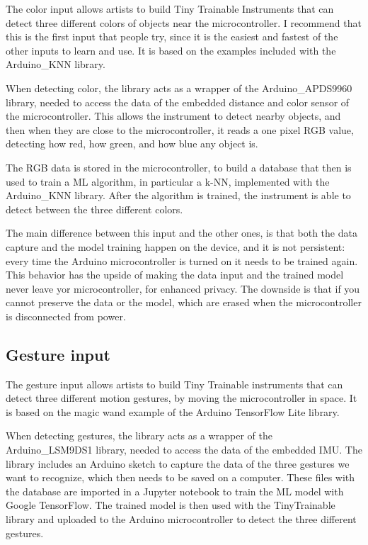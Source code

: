 The color input allows artists to build Tiny Trainable Instruments that can detect three different colors of objects near the microcontroller. I recommend that this is the first input that people try, since it is the easiest and fastest of the other inputs to learn and use. It is based on the examples included with the Arduino{\_}KNN library.

When detecting color, the library acts as a wrapper of the Arduino{\_}APDS9960 library, needed to access the data of the embedded distance and color sensor of the microcontroller. This allows the instrument to detect nearby objects, and then when they are close to the microcontroller, it reads a one pixel \acrshort{RGB} value, detecting how red, how green, and how blue any object is.

The \acrshort{RGB} data is stored in the microcontroller, to build a database that then is used to train a \acrshort{ML} algorithm, in particular a \acrfull{k-NN}, implemented with the Arduino{\_}KNN library. After the algorithm is trained, the instrument is able to detect between the three different colors.

The main difference between this input and the other ones, is that both the data capture and the model training happen on the device, and it is not persistent: every time the Arduino microcontroller is turned on it needs to be trained again. This behavior has the upside of making the data input and the trained model never leave yor microcontroller, for enhanced privacy. The downside is that if you cannot preserve the data or the model, which are erased when the microcontroller is disconnected from power.

\subsection{Gesture input}

The gesture input allows artists to build Tiny Trainable instruments that can detect three different motion gestures, by moving the microcontroller in space. It is based on the magic wand example of the Arduino TensorFlow Lite library.

When detecting gestures, the library acts as a wrapper of the Arduino{\_}LSM9DS1 library, needed to access the data of the embedded \acrfull{IMU}. The library includes an Arduino sketch to capture the data of the three gestures we want to recognize, which then needs to be saved on a computer. These files with the database are imported in a Jupyter notebook to train the \acrshort{ML} model with Google TensorFlow. The trained model is then used with the TinyTrainable library and uploaded to the Arduino microcontroller to detect the three different gestures.

